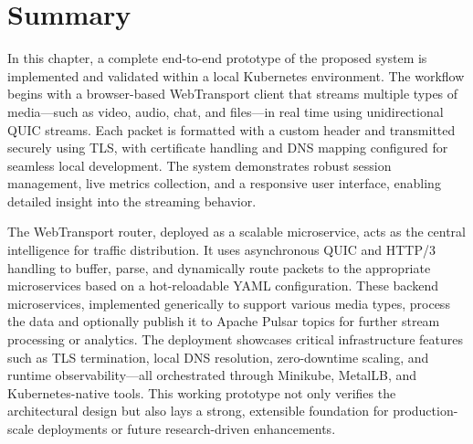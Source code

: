 




\section{Summary}

In this chapter, a complete end-to-end prototype of the proposed system is implemented and validated within a local Kubernetes environment. The workflow begins with a browser-based WebTransport client that streams multiple types of media—such as video, audio, chat, and files—in real time using unidirectional QUIC streams. Each packet is formatted with a custom header and transmitted securely using TLS, with certificate handling and DNS mapping configured for seamless local development. The system demonstrates robust session management, live metrics collection, and a responsive user interface, enabling detailed insight into the streaming behavior.

The WebTransport router, deployed as a scalable microservice, acts as the central intelligence for traffic distribution. It uses asynchronous QUIC and HTTP/3 handling to buffer, parse, and dynamically route packets to the appropriate microservices based on a hot-reloadable YAML configuration. These backend microservices, implemented generically to support various media types, process the data and optionally publish it to Apache Pulsar topics for further stream processing or analytics. The deployment showcases critical infrastructure features such as TLS termination, local DNS resolution, zero-downtime scaling, and runtime observability—all orchestrated through Minikube, MetalLB, and Kubernetes-native tools. This working prototype not only verifies the architectural design but also lays a strong, extensible foundation for production-scale deployments or future research-driven enhancements.